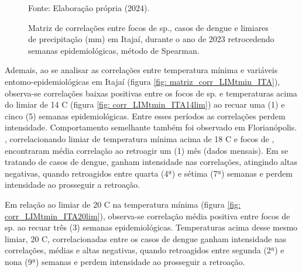 
\begin{figure}[htbp]
    \begin{center}
    \caption{Matriz de correlações entre focos de  sp., casos de dengue e limiares de precipitação (mm) em Itajaí, durante o ano de 2023 retrocedendo semanas epidemiológicas, método de Spearman.}
    \label{fig: matriz_corr_LIMprec_ITA}
        \hfill
    \end{center}
    \small{Fonte: Elaboração própria (2024).}
\end{figure}

\indent Ademais, ao se analisar as correlações entre temperatura mínima e variáveis entomo-epidemiológicas em Itajaí (figura \ref{fig: matriz_corr_LIMtmin_ITA}), observa-se correlações baixas positivas entre os focos de  sp. e temperaturas acima do limiar de 14 C (figura \ref{fig: corr_LIMtmin_ITA14lim}) ao recuar uma (1) e cinco (5) semanas epidemiológicas. Entre esses períodos as correlações perdem intensidade. Comportamento semelhante também foi observado em Florianópolis. , correlacionando limiar de temperatura mínima acima de 18 C e focos de , encontraram média correlação ao retroagir um (1) mês (dados mensais). Em se tratando de casos de dengue, ganham intensidade nas correlações, atingindo altas negativas, quando retroagidos entre quarta (4ª) e sétima (7ª) semanas e perdem intensidade ao prosseguir a retroação.

\indent Em relação ao limiar de 20 C na temperatura mínima (figura \ref{fig: corr_LIMtmin_ITA20lim}), observa-se correlação média positiva entre focos de  sp. ao recuar três (3) semanas epidemiológicas. Temperaturas acima desse mesmo limiar, 20 C, correlacionadas entre os casos de dengue ganham intensidade nas correlações, médias e altas negativas, quando retroagidos entre segunda (2ª) e nona (9ª) semanas e perdem intensidade ao prosseguir a retroação.

